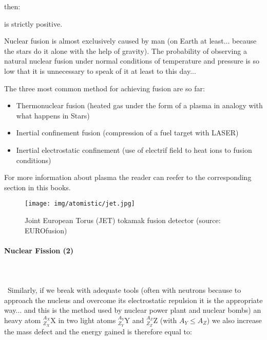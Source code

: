 	then:
	
	is strictly positive.
	
	Nuclear fusion is almost exclusively caused by man (on Earth at least... because the stars do it alone with the help of gravity). The probability of observing a natural nuclear fusion under normal conditions of temperature and pressure is so low that it is unnecessary to speak of it at least to this day...
	
	The three most common method for achieving fusion are so far:
	\begin{itemize}
		\item Thermonuclear fusion (heated gas under the form of a plasma in analogy with what happens in Stars)
		\item Inertial confinement fusion (compression of a fuel target with LASER)
		\item Inertial electrostatic confinement (use of electrif field to heat ions to fusion conditions)
	\end{itemize}
	For more information about plasma the reader can reefer to the corresponding section in this books.
	\begin{figure}[H]
		\centering
		\texttt{[image: img/atomistic/jet.jpg]}
		\caption[Joint European Torus (JET) tokamak fusion detector]{Joint European Torus (JET) tokamak fusion detector (source: EUROfusion)}
	\end{figure}
	
	\paragraph{Nuclear Fission (2)}\mbox{}\\\\\
	Similarly, if we break with adequate tools (often with neutrons because to approach the nucleus and overcome its electrostatic repulsion it is the appropriate way... and this is the method used by nuclear power plant and nuclear bombs) an heavy atom $_{Z_X}^{A_X}\mathrm{X}$ in two light atoms $_{Z_Y}^{A_Y}\mathrm{Y}$ and $_{Z_Z}^{A_Z}\mathrm{Z}$ (with $A_Y\le A_Z$) we also increase the mass defect and the energy gained is therefore equal to:
	
